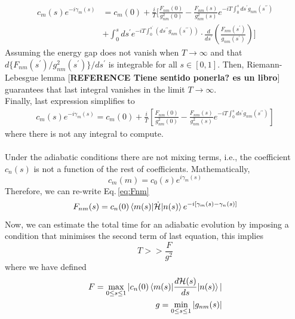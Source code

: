  \begin{equation}
 \begin{split}
      c_{m}(s)e^{-i\gamma_{m}(s)} & = c_{m}(0) + \frac{i}{T}\Biggr[\frac{F_{nm}(0)}{g^{2}_{nm}(0)} - \frac{F_{nm}(s)}{g^{2}_{nm}(s)}e^{-iT\int_{0}^{s}ds^{\prime}g_{nm}(s^{\prime \prime})} \\
      & + \int_{0}^{s}ds^{\prime} e^{-iT\int_{0}^{s^{\prime}}\left(ds^{\prime \prime}g_{nm}(s^{\prime\prime}) \right)} \cdot \frac{d}{ds^{\prime}}\left(\frac{F_{nm}(s^{\prime})}{g_{nm}(s^{\prime})}\right)\Biggr]
\end{split}
\end{equation}
 Assuming the energy gap does not vanish when $T \rightarrow \infty$ and that $d\{F_{nm}(s^{\prime})/g_{nm}^{2}(s^{\prime})\}/ds^{\prime}$ is integrable for all $s \in [0,1]$. Then, Riemann-Lebesgue lemma [\textbf{REFERENCE Tiene sentido ponerla? es un libro}] guarantees that last integral vanishes in the limit $T \rightarrow \infty$.\\ Finally, last expression simplifies to
  \begin{align}
     c_{m}(s)e^{-i\gamma_{m}(s)} = c_{m}(0) + \frac{i}{T}\left[\frac{F_{nm}(0)}{g^{2}_{nm}(0)} - \frac{F_{nm}(s)}{g^{2}_{nm}(s)}e^{-iT\int_{0}^{s}ds^{\prime}g_{nm}(s^{\prime \prime})}\right] 
 \end{align}
 where there is not any integral to compute.\\\\
 Under the adiabatic conditions there are not mixing terms, i.e., the coefficient $c_{n}(s)$ is not a function of the rest of coefficients. Mathematically,
\begin{equation}
    c_{m}(m) = c_{0}(s)e^{i\gamma_{m}(s)}
\end{equation}
Therefore, we can re-write Eq.\,\eqref{eq:Fnm}
\begin{equation}
    F_{nm}(s) = c_{n}(0)\braket{m(s)|\dot{\mathcal{H}}|n(s)} e^{-i\left[\gamma_{m}(s) - \gamma_{n}(s)\right]}
\end{equation}
 Now, we can estimate the total time for an adiabatic evolution by imposing a condition that minimises the second term of last equation, this implies
 \begin{equation}
     T >> \frac{F}{g^{2}}
 \end{equation}
 where we have defined
 \begin{align}
     F = \max_{0 \leq s \leq 1} |c_{n}(0)\braket{m(s)|\frac{d\mathcal{H}(s)}{ds}| n(s)}| \\
     g = \min_{0 \leq s \leq 1} |g_{nm}(s)|
 \end{align}
